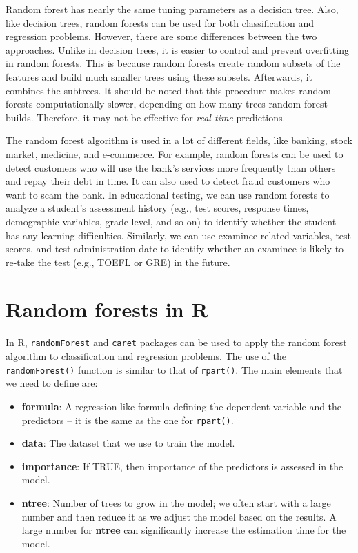 \documentclass[
]{book}
\providecommand{\tightlist}{%
  \setlength{\itemsep}{0pt}\setlength{\parskip}{0pt}}
\begin{document}
Random forest has nearly the same tuning parameters as a decision tree. Also, like decision trees, random forests can be used for both classification and regression problems. However, there are some differences between the two approaches. Unlike in decision trees, it is easier to control and prevent overfitting in random forests. This is because random forests create random subsets of the features and build much smaller trees using these subsets. Afterwards, it combines the subtrees. It should be noted that this procedure makes random forests computationally slower, depending on how many trees random forest builds. Therefore, it may not be effective for \emph{real-time} predictions.

The random forest algorithm is used in a lot of different fields, like banking, stock market, medicine, and e-commerce. For example, random forests can be used to detect customers who will use the bank's services more frequently than others and repay their debt in time. It can also used to detect fraud customers who want to scam the bank. In educational testing, we can use random forests to analyze a student's assessment history (e.g., test scores, response times, demographic variables, grade level, and so on) to identify whether the student has any learning difficulties. Similarly, we can use examinee-related variables, test scores, and test administration date to identify whether an examinee is likely to re-take the test (e.g., TOEFL or GRE) in the future.

\hypertarget{random-forests-in-r}{%
\section{Random forests in R}\label{random-forests-in-r}}

In R, \texttt{randomForest} and \texttt{caret} packages can be used to apply the random forest algorithm to classification and regression problems. The use of the \texttt{randomForest()} function is similar to that of \texttt{rpart()}. The main elements that we need to define are:

\begin{itemize}
\tightlist
\item
  \textbf{formula}: A regression-like formula defining the dependent variable and the predictors -- it is the same as the one for \texttt{rpart()}.
\item
  \textbf{data}: The dataset that we use to train the model.
\item
  \textbf{importance}: If TRUE, then importance of the predictors is assessed in the model.
\item
  \textbf{ntree}: Number of trees to grow in the model; we often start with a large number and then reduce it as we adjust the model based on the results. A large number for \textbf{ntree} can significantly increase the estimation time for the model.
\end{itemize}
\end{document}
